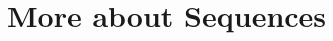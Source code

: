 \documentclass[12pt]{article}
\begin{document}
\section{More about Sequences}

\begin{comment}

\begin{description}

\item[Problem 12, chapter 8:] {\bf STAR} The aim of this problem is to show that if $A$ is a nonempty set (assumption (1)) and $B$ is a nonempty set (assumption (2)) and for any $a \in A$, for any $b \in B$, $a \leq b$ (assumption (3)), then $\sup(A) \leq \inf(B)$.
We show this by showing a series of claims to be true.

\begin{description}

\item[$A$ has a least upper bound:]  To show that a set has a least upper bound using P13, we need to show that it is nonempty and that it is bounded above.  $A$ is assumed nonempty (1).
$B$ is assumed nonempty (2), so we can choose a $b_1 \in B$:  $b_1$ is an upper bound for $A$, since for any $a \in A$ we have $a \leq b_1$ by assumption (3).  So $A$ is bounded above and $\sup(A)$ exists by P13.

\item[$B$ has a greatest lower bound:]  To show that a set has a greatest lower bound, we need to show that it is nonempty and bounded below.  $B$ is assumed nonempty (2).  $A$ is assumed nonempty
(1) so we can choose $a_1 \in A$.  $a_1$ is a lower bound for $B$ because by (3), for any $b \in B$, $a_1 \leq b$.  So we know that $\inf(B)$ exists by (P13b).

\item[for any $b \in B$, $\sup(A)\leq b$:]  Any element $b$ of $B$ is an upper bound for $A$.  $\sup(A)$ is the least upper bound of $A$, so for any upper bound $M$ of $A$, $\sup(A) \leq M$, and in particular $\sup(A)\leq b$.

\item[The least upper bound of $A$ is less than the greatest lower bound of $B$:]  The previous claim says in different words that $\sup(A)$ is a lower bound for the set $B$.  $\inf(B)$ is the {\em greatest\/} lower bound
for $B$, which means that for any lower bound $m$ of $B$ we have $m \leq \inf(B)$, and in particular $\sup(A) \leq \inf(B)$.

\end{description}

\end{comment}
\end{document}
